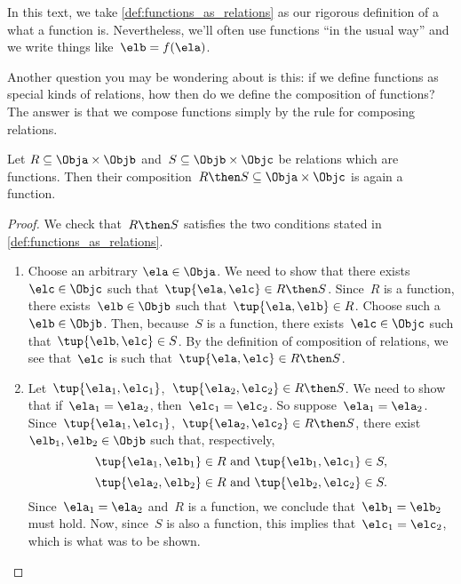 In this text, we take \cref{def:functions_as_relations} as our rigorous definition of a what a function is. Nevertheless, we'll often use functions ``in the usual way'' and we write things like~$\elb = f(\ela)$.

Another question you may be wondering about is this: if we define functions as special kinds of relations, how then do we define the composition of functions? The answer is that we compose functions simply by the rule for composing relations.

\begin{lemma}
  \label{lem:comprelfun}
  Let $R \subseteq \Obja \times \Objb$ and~$S \subseteq \Objb \times \Objc$ be relations which are functions. Then their composition~$R \then S \subseteq \Obja \times \Objc$ is again a function.
\end{lemma}

\begin{proof}
  We check that~$R \then S$ satisfies the two conditions stated in \cref{def:functions_as_relations}.

  \begin{enumerate}
    \item Choose an arbitrary $\ela \in \Obja$. We need to show that there exists~$\elc \in \Objc$ such that~$\tup{\ela,\elc} \in R \then S$. Since~$R$ is a function, there exists~$\elb \in \Objb$ such that~$\tup{\ela,\elb} \in R$. Choose such a~$\elb \in \Objb$. Then, because~$S$ is a function, there exists~$\elc \in \Objc$ such that~$\tup{\elb,\elc} \in S$. By the definition of composition of relations, we see that~$\elc$ is such that~$\tup{\ela,\elc} \in R \then S$.
    \item Let~$\tup{\ela_1, \elc_1}$,~$\tup{\ela_2,\elc_2} \in R \then S$. We need to show that if~$\ela_1 = \ela_2$, then~$\elc_1 = \elc_2$. So suppose~$\ela_1 = \ela_2$. Since~$\tup{\ela_1, \elc_1}$,~$\tup{\ela_2,\elc_2} \in R \then S$, there exist~$\elb_1, \elb_2 \in \Objb$ such that, respectively,
    \begin{equation*}
      \tup{\ela_1, \elb_1} \in R \text{ and } \tup{\elb_1, \elc_1} \in S,
    \end{equation*}
    \begin{equation*}
      \tup{\ela_2, \elb_2} \in R \text{ and } \tup{\elb_2, \elc_2} \in S.
    \end{equation*}
    Since~$\ela_1 = \ela_2$ and~$R$ is a function, we conclude that~$\elb_1 = \elb_2$ must hold. Now, since~$S$ is also a function, this implies that~$\elc_1 = \elc_2$, which is what was to be shown.
  \end{enumerate}
\end{proof}

